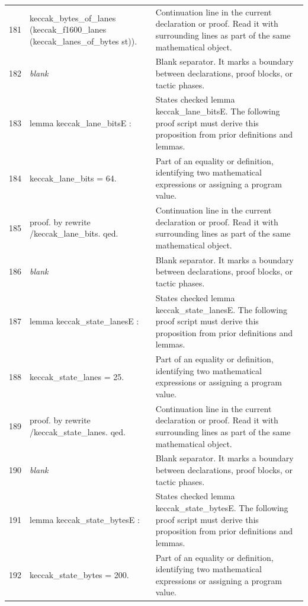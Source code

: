 \documentclass[10pt]{article}
\begin{document}
\begin{longtable}{r L{0.53\textwidth} L{0.37\textwidth}}
181 & {\ttfamily\scriptsize   keccak\_bytes\_of\_lanes (keccak\_f1600\_lanes (keccak\_lanes\_of\_bytes st)).} & Continuation line in the current declaration or proof.  Read it with surrounding lines as part of the same mathematical object. \\
182 & {\ttfamily\scriptsize \emph{blank}} & Blank separator.  It marks a boundary between declarations, proof blocks, or tactic phases. \\
183 & {\ttfamily\scriptsize lemma keccak\_lane\_bitsE :} & States checked lemma keccak\_lane\_bitsE.  The following proof script must derive this proposition from prior definitions and lemmas. \\
184 & {\ttfamily\scriptsize   keccak\_lane\_bits = 64.} & Part of an equality or definition, identifying two mathematical expressions or assigning a program value. \\
185 & {\ttfamily\scriptsize proof. by rewrite /keccak\_lane\_bits. qed.} & Continuation line in the current declaration or proof.  Read it with surrounding lines as part of the same mathematical object. \\
186 & {\ttfamily\scriptsize \emph{blank}} & Blank separator.  It marks a boundary between declarations, proof blocks, or tactic phases. \\
187 & {\ttfamily\scriptsize lemma keccak\_state\_lanesE :} & States checked lemma keccak\_state\_lanesE.  The following proof script must derive this proposition from prior definitions and lemmas. \\
188 & {\ttfamily\scriptsize   keccak\_state\_lanes = 25.} & Part of an equality or definition, identifying two mathematical expressions or assigning a program value. \\
189 & {\ttfamily\scriptsize proof. by rewrite /keccak\_state\_lanes. qed.} & Continuation line in the current declaration or proof.  Read it with surrounding lines as part of the same mathematical object. \\
190 & {\ttfamily\scriptsize \emph{blank}} & Blank separator.  It marks a boundary between declarations, proof blocks, or tactic phases. \\
191 & {\ttfamily\scriptsize lemma keccak\_state\_bytesE :} & States checked lemma keccak\_state\_bytesE.  The following proof script must derive this proposition from prior definitions and lemmas. \\
192 & {\ttfamily\scriptsize   keccak\_state\_bytes = 200.} & Part of an equality or definition, identifying two mathematical expressions or assigning a program value. \\

\end{longtable}
\end{document}
